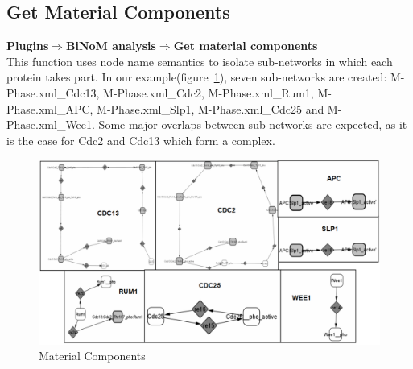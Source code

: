 \subsection{Get Material Components}
\textbf{Plugins$\Rightarrow$BiNoM analysis$\Rightarrow$Get material components}\\
This function uses node name semantics to isolate sub-networks in which each protein takes part. In our example(figure~\ref{Material_Components}), seven sub-networks are created: M-Phase.xml\_Cdc13, M-Phase.xml\_Cdc2, M-Phase.xml\_Rum1, M-Phase.xml\_APC, M-Phase.xml\_Slp1, M-Phase.xml\_Cdc25 and M-Phase.xml\_Wee1. Some major overlaps between sub-networks are expected, as it is the case for Cdc2 and Cdc13 which form a complex.\\
\begin{figure}
\centering
\includegraphics[width=14 cm]{graphics/Material_Components}
\caption{Material Components}
\label{Material_Components}
\end{figure}

